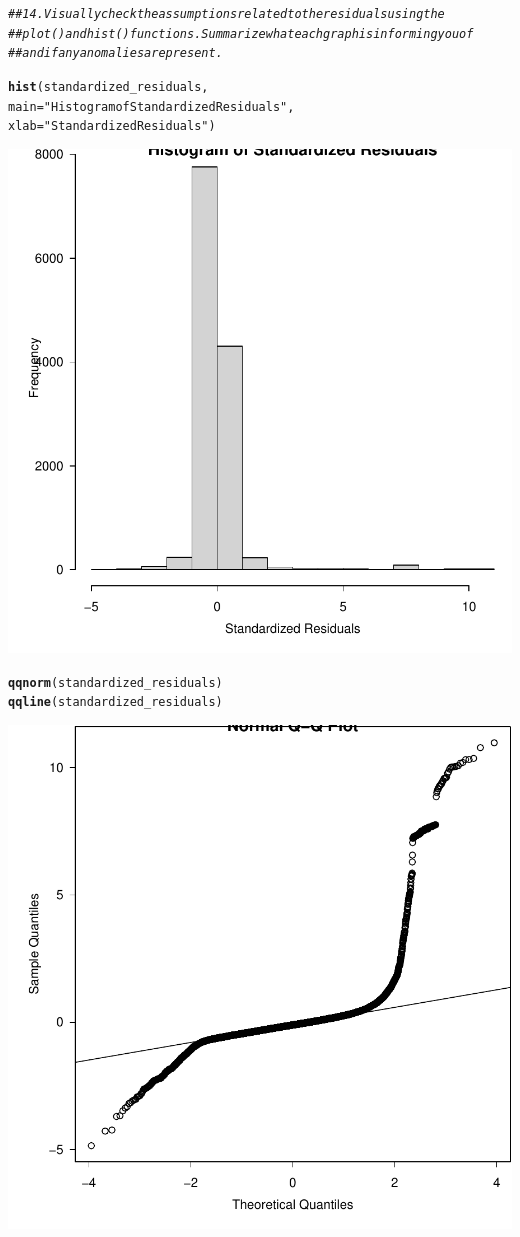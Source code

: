 \documentclass{article}\usepackage[]{graphicx}\usepackage[]{xcolor}
\makeatletter
\newcommand{\hlstr}[1]{\textcolor[rgb]{0.192,0.494,0.8}{#1}}%
\newcommand{\hlcom}[1]{\textcolor[rgb]{0.678,0.584,0.686}{\textit{#1}}}%
\newcommand{\hlstd}[1]{\textcolor[rgb]{0.345,0.345,0.345}{#1}}%
\newcommand{\hlkwc}[1]{\textcolor[rgb]{0.333,0.667,0.333}{#1}}%
\newcommand{\hlkwd}[1]{\textcolor[rgb]{0.737,0.353,0.396}{\textbf{#1}}}%
\newenvironment{kframe}{%
 \def\at@end@of@kframe{}%
 \ifinner\ifhmode%
  \def\at@end@of@kframe{\end{minipage}}%
  \begin{minipage}{\columnwidth}%
 \fi\fi%
 \def\FrameCommand##1{\hskip\@totalleftmargin \hskip-\fboxsep
 \colorbox{shadecolor}{##1}\hskip-\fboxsep
     \hskip-\linewidth \hskip-\@totalleftmargin \hskip\columnwidth}%
 \MakeFramed {\advance\hsize-\width
   \@totalleftmargin\z@ \linewidth\hsize
   \@setminipage}}%
 {\par\unskip\endMakeFramed%
 \at@end@of@kframe}
\newenvironment{knitrout}{}{} %
\makeatother
\begin{document}
\begin{knitrout}
\begin{kframe}
\begin{alltt}
\hlcom{## 14. Visually check the assumptions related to the residuals using the }
\hlcom{## plot() and hist() functions. Summarize what each graph is informing you of }
\hlcom{## and if any anomalies are present.}

\hlkwd{hist}\hlstd{(standardized_residuals,}
     \hlkwc{main} \hlstd{=} \hlstr{"Histogram of Standardized Residuals"}\hlstd{,}
     \hlkwc{xlab} \hlstd{=} \hlstr{"Standardized Residuals"}\hlstd{)}
\end{alltt}
\end{kframe}

{\centering \includegraphics[width=.6\linewidth]{figure/assignment-8-2-Reppeto-Brian-Rnwauto-report-2} 

}


\begin{kframe}\begin{alltt}
\hlkwd{qqnorm}\hlstd{(standardized_residuals)}
\hlkwd{qqline}\hlstd{(standardized_residuals)}
\end{alltt}
\end{kframe}

{\centering \includegraphics[width=.6\linewidth]{figure/assignment-8-2-Reppeto-Brian-Rnwauto-report-3} 

}
\end{knitrout}
\end{document}
